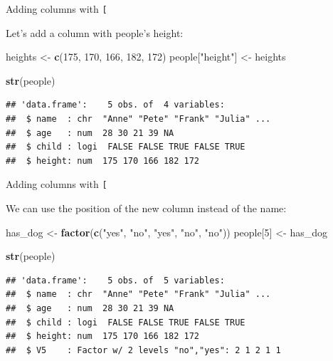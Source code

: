 \documentclass[ignorenonframetext,]{beamer}
\newenvironment{Shaded}{\begin{snugshade}}{\end{snugshade}}
\newcommand{\DecValTok}[1]{\textcolor[rgb]{0.00,0.00,0.81}{#1}}
\newcommand{\KeywordTok}[1]{\textcolor[rgb]{0.13,0.29,0.53}{\textbf{#1}}}
\newcommand{\NormalTok}[1]{#1}
\newcommand{\StringTok}[1]{\textcolor[rgb]{0.31,0.60,0.02}{#1}}
\begin{document}
\begin{frame}[fragile]{Adding columns with \texttt{{[}}}
\protect\hypertarget{adding-columns-with}{}

Let's add a column with people's height:

\begin{Shaded}
\begin{Highlighting}[]
\NormalTok{heights <-}\StringTok{ }\KeywordTok{c}\NormalTok{(}\DecValTok{175}\NormalTok{, }\DecValTok{170}\NormalTok{, }\DecValTok{166}\NormalTok{, }\DecValTok{182}\NormalTok{, }\DecValTok{172}\NormalTok{) }
\NormalTok{people[}\StringTok{"height"}\NormalTok{] <-}\StringTok{ }\NormalTok{heights}

\KeywordTok{str}\NormalTok{(people)}
\end{Highlighting}
\end{Shaded}

\begin{verbatim}
## 'data.frame':    5 obs. of  4 variables:
##  $ name  : chr  "Anne" "Pete" "Frank" "Julia" ...
##  $ age   : num  28 30 21 39 NA
##  $ child : logi  FALSE FALSE TRUE FALSE TRUE
##  $ height: num  175 170 166 182 172
\end{verbatim}

\end{frame}

\begin{frame}[fragile]{Adding columns with \texttt{{[}}}
\protect\hypertarget{adding-columns-with-1}{}

We can use the position of the new column instead of the name:

\begin{Shaded}
\begin{Highlighting}[]
\NormalTok{has_dog <-}\StringTok{ }\KeywordTok{factor}\NormalTok{(}\KeywordTok{c}\NormalTok{(}\StringTok{"yes"}\NormalTok{, }\StringTok{"no"}\NormalTok{, }\StringTok{"yes"}\NormalTok{, }\StringTok{"no"}\NormalTok{, }\StringTok{"no"}\NormalTok{))}
\NormalTok{people[}\DecValTok{5}\NormalTok{] <-}\StringTok{ }\NormalTok{has_dog}

\KeywordTok{str}\NormalTok{(people)}
\end{Highlighting}
\end{Shaded}

\begin{verbatim}
## 'data.frame':    5 obs. of  5 variables:
##  $ name  : chr  "Anne" "Pete" "Frank" "Julia" ...
##  $ age   : num  28 30 21 39 NA
##  $ child : logi  FALSE FALSE TRUE FALSE TRUE
##  $ height: num  175 170 166 182 172
##  $ V5    : Factor w/ 2 levels "no","yes": 2 1 2 1 1
\end{verbatim}

\end{frame}
\end{document}
